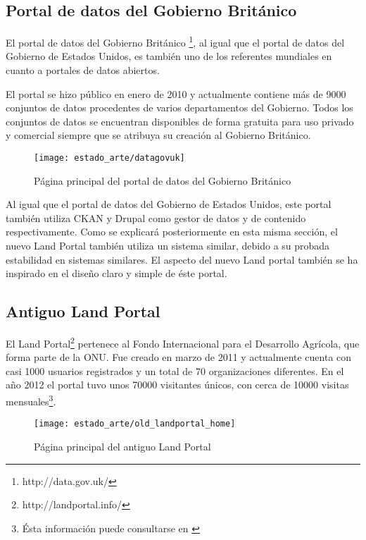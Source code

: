 {\subsection{Portal de datos del Gobierno Británico}
El portal de datos del Gobierno Británico \footnote{http://data.gov.uk/}, al igual que el portal de datos del Gobierno de Estados Unidos, es también uno de los referentes mundiales en cuanto a portales de datos abiertos.

El portal se hizo público en enero de 2010 y actualmente contiene más de 9000 conjuntos de datos procedentes de varios departamentos del Gobierno.  Todos los conjuntos de datos se encuentran disponibles de forma gratuita para uso privado y comercial siempre que se atribuya su creación al Gobierno Británico.
\begin{figure}[h]
\centering
\texttt{[image: estado\_arte/datagovuk]}
\caption{Página principal del portal de datos del Gobierno Británico}
\end{figure}

Al igual que el portal de datos del Gobierno de Estados Unidos, este portal también utiliza CKAN y Drupal como gestor de datos y de contenido respectivamente.  Como se explicará posteriormente en esta misma sección, el nuevo Land Portal también utiliza un sistema similar, debido a su probada estabilidad en sistemas similares.  El aspecto del nuevo Land portal también se ha inspirado en el diseño claro y simple de éste portal.

\subsection{Antiguo Land Portal}
El Land Portal\footnote{http://landportal.info/} pertenece al Fondo Internacional para
el Desarrollo Agrícola, que forma parte de la ONU.  Fue creado en marzo de 2011 y actualmente cuenta con casi 1000 usuarios registrados y un total de 70 organizaciones diferentes. En el año 2012 el portal tuvo unos 70000 visitantes únicos, con cerca de 10000 visitas mensuales\footnote{Ésta información puede consultarse en \cite[página 3]{landportal-strategy}}.
\begin{figure}[h]
\centering
\texttt{[image: estado\_arte/old\_landportal\_home]}
\caption{Página principal del antiguo Land Portal}
\end{figure}

}
